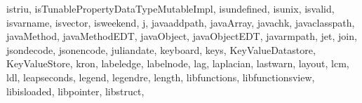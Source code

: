 {{        istriu,%
        isTunablePropertyDataTypeMutableImpl,%
        isundefined,%
        isunix,%
        isvalid,%
        isvarname,%
        isvector,%
        isweekend,%
        j,%
        javaaddpath,%
        javaArray,%
        javachk,%
        javaclasspath,%
        javaMethod,%
        javaMethodEDT,%
        javaObject,%
        javaObjectEDT,%
        javarmpath,%
        jet,%
        join,%
        jsondecode,%
        jsonencode,%
        juliandate,%
        keyboard,%
        keys,%
        KeyValueDatastore,%
        KeyValueStore,%
        kron,%
        labeledge,%
        labelnode,%
        lag,%
        laplacian,%
        lastwarn,%
        layout,%
        lcm,%
        ldl,%
        leapseconds,%
        legend,%
        legendre,%
        length,%
        libfunctions,%
        libfunctionsview,%
        libisloaded,%
        libpointer,%
        libstruct,%
}}
